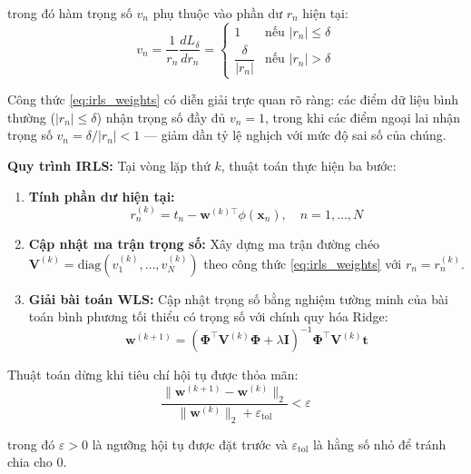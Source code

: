trong đó hàm trọng số $v_n$ phụ thuộc vào phần dư $r_n$ hiện tại:
\begin{equation}
v_n = \frac{1}{r_n}\frac{dL_\delta}{dr_n} = \begin{cases}
  1 & \text{nếu } |r_n| \le \delta \\[4pt]
  \dfrac{\delta}{|r_n|} & \text{nếu } |r_n| > \delta
\end{cases}
\label{eq:irls_weights}
\end{equation}

Công thức \eqref{eq:irls_weights} có diễn giải trực quan rõ ràng: các điểm 
dữ liệu bình thường ($|r_n| \le \delta$) nhận trọng số đầy đủ $v_n = 1$, 
trong khi các điểm ngoại lai nhận trọng số $v_n = \delta/|r_n| < 1$ --- giảm 
dần tỷ lệ nghịch với mức độ sai số của chúng.

\textbf{Quy trình IRLS:} Tại vòng lặp thứ $k$, thuật toán thực hiện ba bước:

\begin{enumerate} [labelsep=10pt, leftmargin=2cm]
    \item \textbf{Tính phần dư hiện tại:}
    $$r_n^{(k)} = t_n - \boldsymbol{w}^{(k)\top}\phi(\boldsymbol{x}_n), 
      \quad n = 1, \ldots, N$$

    \item \textbf{Cập nhật ma trận trọng số:} Xây dựng ma trận đường chéo 
    $\mathbf{V}^{(k)} = \mathrm{diag}(v_1^{(k)}, \ldots, v_N^{(k)})$ theo 
    công thức \eqref{eq:irls_weights} với $r_n = r_n^{(k)}$.

    \item \textbf{Giải bài toán WLS:} Cập nhật trọng số bằng nghiệm tường 
    minh của bài toán bình phương tối thiểu có trọng số với chính quy hóa 
    Ridge:
    \begin{equation}
    \boldsymbol{w}^{(k+1)} 
      = \left(\boldsymbol{\Phi}^{\top}\mathbf{V}^{(k)}\boldsymbol{\Phi} 
        + \lambda\mathbf{I}\right)^{-1} 
        \boldsymbol{\Phi}^{\top}\mathbf{V}^{(k)}\boldsymbol{t}
    \label{eq:irls_update}
    \end{equation}
\end{enumerate}

Thuật toán dừng khi tiêu chí hội tụ được thỏa mãn:
$$\frac{\|\boldsymbol{w}^{(k+1)} - \boldsymbol{w}^{(k)}\|_2}
       {\|\boldsymbol{w}^{(k)}\|_2 + \varepsilon_{\mathrm{tol}}} < \varepsilon$$

trong đó $\varepsilon > 0$ là ngưỡng hội tụ được đặt trước và 
$\varepsilon_{\mathrm{tol}}$ là hằng số nhỏ để tránh chia cho 0.

